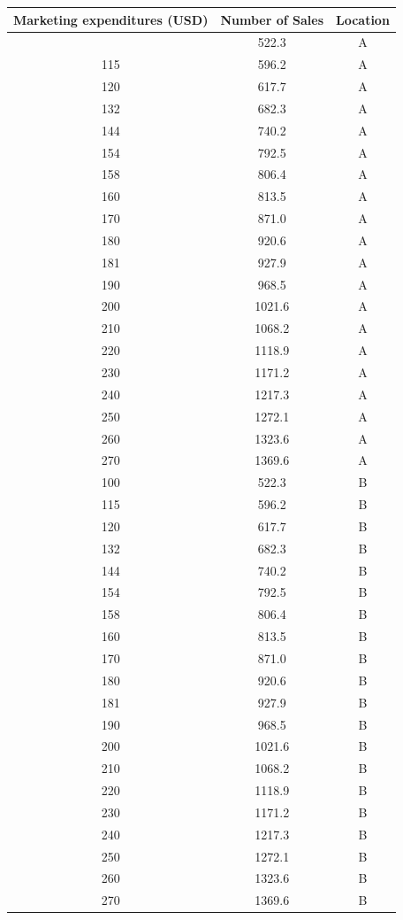 \documentclass[
  letterpaper,
  DIV=11,
  numbers=noendperiod]{scrreprt}
\begin{document}
\begin{longtable}[]{@{}ccc@{}}
\toprule\noalign{}
Marketing expenditures (USD) & Number of Sales & Location \\
\midrule\noalign{}
\endhead
\bottomrule\noalign{}
\endlastfoot
100 & 522.3 & A \\
115 & 596.2 & A \\
120 & 617.7 & A \\
132 & 682.3 & A \\
144 & 740.2 & A \\
154 & 792.5 & A \\
158 & 806.4 & A \\
160 & 813.5 & A \\
170 & 871.0 & A \\
180 & 920.6 & A \\
181 & 927.9 & A \\
190 & 968.5 & A \\
200 & 1021.6 & A \\
210 & 1068.2 & A \\
220 & 1118.9 & A \\
230 & 1171.2 & A \\
240 & 1217.3 & A \\
250 & 1272.1 & A \\
260 & 1323.6 & A \\
270 & 1369.6 & A \\
100 & 522.3 & B \\
115 & 596.2 & B \\
120 & 617.7 & B \\
132 & 682.3 & B \\
144 & 740.2 & B \\
154 & 792.5 & B \\
158 & 806.4 & B \\
160 & 813.5 & B \\
170 & 871.0 & B \\
180 & 920.6 & B \\
181 & 927.9 & B \\
190 & 968.5 & B \\
200 & 1021.6 & B \\
210 & 1068.2 & B \\
220 & 1118.9 & B \\
230 & 1171.2 & B \\
240 & 1217.3 & B \\
250 & 1272.1 & B \\
260 & 1323.6 & B \\
270 & 1369.6 & B \\
\end{longtable}
\end{document}
